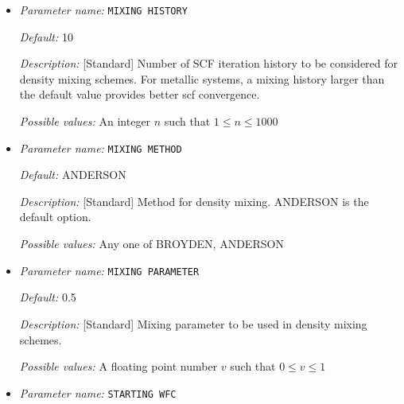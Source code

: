 \begin{itemize}


{\it Default:} 100


{\it Description:} [Standard] Maximum number of iterations to be allowed for SCF convergence


{\it Possible values:} An integer $n$ such that $1\leq n \leq 1000$
\item {\it Parameter name:} {\tt MIXING HISTORY}
\label{parameters:SCF parameters/MIXING HISTORY}
\label{parameters:SCF_20parameters/MIXING_20HISTORY}




{\it Default:} 10


{\it Description:} [Standard] Number of SCF iteration history to be considered for density mixing schemes. For metallic systems, a mixing history larger than the default value provides better scf convergence.


{\it Possible values:} An integer $n$ such that $1\leq n \leq 1000$
\item {\it Parameter name:} {\tt MIXING METHOD}
\label{parameters:SCF parameters/MIXING METHOD}
\label{parameters:SCF_20parameters/MIXING_20METHOD}




{\it Default:} ANDERSON


{\it Description:} [Standard] Method for density mixing. ANDERSON is the default option.


{\it Possible values:} Any one of BROYDEN, ANDERSON
\item {\it Parameter name:} {\tt MIXING PARAMETER}
\label{parameters:SCF parameters/MIXING PARAMETER}
\label{parameters:SCF_20parameters/MIXING_20PARAMETER}




{\it Default:} 0.5


{\it Description:} [Standard] Mixing parameter to be used in density mixing schemes.


{\it Possible values:} A floating point number $v$ such that $0 \leq v \leq 1$
\item {\it Parameter name:} {\tt STARTING WFC}
\label{parameters:SCF parameters/STARTING WFC}
\label{parameters:SCF_20parameters/STARTING_20WFC}



\end{itemize}
